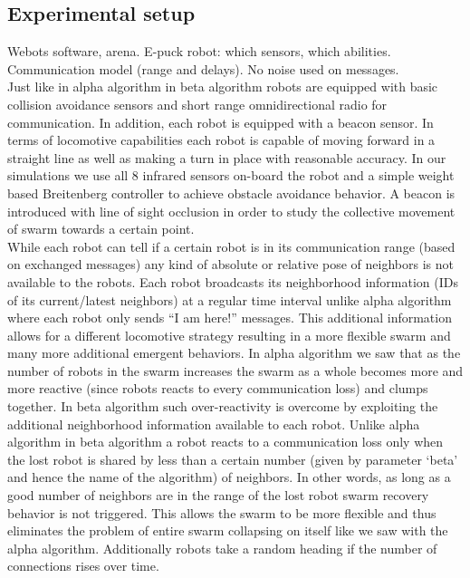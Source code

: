 \documentclass[a4paper, 10pt, conference]{ieeeconf}
\begin{document}
  \subsection{Experimental setup} \label{simulations}
  Webots software, arena. E-puck robot: which sensors, which abilities. Communication model (range and delays). No noise used on messages.\\

  Just like in alpha algorithm in beta algorithm robots are equipped with basic collision avoidance sensors and short range omnidirectional radio for communication. In addition, each robot is equipped with a beacon sensor. In terms of locomotive capabilities each robot is capable of moving forward in a straight line as well as making a turn in place with reasonable accuracy. In our simulations we use all 8 infrared sensors on-board the robot and a simple weight based Breitenberg controller to achieve obstacle avoidance behavior. A beacon is introduced with line of sight occlusion in order to study the collective movement of swarm towards a certain point. \\
  While each robot can tell if a certain robot is in its communication range (based on exchanged messages) any kind of absolute or relative pose of neighbors is not available to the robots. Each robot broadcasts its neighborhood information (IDs of its current/latest neighbors) at a regular time interval unlike alpha algorithm where each robot only sends ``I am here!'' messages. This additional information allows for a different locomotive strategy resulting in a more flexible swarm and many more additional emergent behaviors. In alpha algorithm we saw that as the number of robots in the swarm increases the swarm as a whole becomes more and more reactive (since robots reacts to every communication loss) and clumps together. In beta algorithm such over-reactivity is overcome by exploiting the additional neighborhood information available to each robot. Unlike alpha algorithm in beta algorithm a robot reacts to a communication loss only when the lost robot is shared by less than a certain number (given by parameter `beta' and hence the name of the algorithm) of neighbors. In other words, as long as a good number of neighbors are in the range of the lost robot swarm recovery behavior is not triggered. This allows the swarm to be more flexible and thus eliminates the problem of entire swarm collapsing on itself like we saw with the alpha algorithm. Additionally robots take a random heading if the number of connections rises over time.
\end{document}
